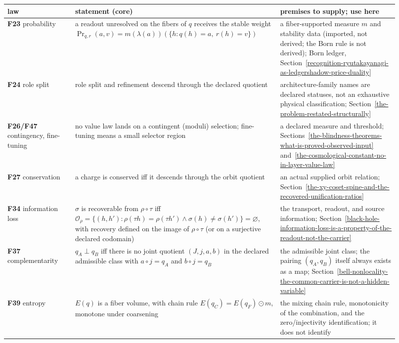 \documentclass[11pt]{article}
\theoremstyle{definition}
\begin{document}
\begin{center}
\small
\begin{longtable}[]{@{}p{0.16\linewidth}p{0.48\linewidth}p{0.28\linewidth}@{}}
\toprule
law & statement (core) & premises to supply; use here\\
\midrule
\endhead
\textbf{F23} probability & a readout unresolved on the fibers of \(q\) receives the stable weight
\(\Pr_{q,r}(a,v)=m(\lambda(a))(\{h: q(h)=a,\ r(h)=v\})\) & a fiber-supported measure \(m\) and stability data
(imported, not derived; the Born rule is not derived); Born ledger, Section~\ref{recognition-ryutakayanagi-as-ledgershadow-price-duality}\\
\textbf{F24} role split & role split and refinement descend through the declared quotient & architecture-family names
are declared statuses, not an exhaustive physical classification; Section~\ref{the-problem-restated-structurally}\\
\textbf{F26/F47} contingency, fine-tuning & no value law lands on a contingent (moduli) selection; fine-tuning means a
small selector region & a declared measure and threshold; Sections~\ref{the-blindness-theorems-what-is-proved-observed-input}
and~\ref{the-cosmological-constant-no-in-layer-value-law}\\
\textbf{F27} conservation & a charge is conserved iff it descends through the orbit quotient & an actual supplied orbit
relation; Section~\ref{the-xy-coset-spine-and-the-recovered-unification-ratios}\\
\textbf{F34} information loss & \(\sigma\) is recoverable from \(\rho\circ\tau\) iff
\(\mathcal O_\rho=\{(h,h'):\rho(\tau h)=\rho(\tau h') \wedge \sigma(h)\neq\sigma(h')\}=\varnothing\), with recovery
defined on the image of \(\rho\circ\tau\) (or on a surjective declared codomain) & the transport, readout, and source
information; Section~\ref{black-hole-information-loss-is-a-property-of-the-readout-not-the-carrier}\\
\textbf{F37} complementarity & \(q_A\perp q_B\) iff there is no joint quotient \((J,j,a,b)\) in the declared admissible
class with \(a\circ j=q_A\) and \(b\circ j=q_B\) & the admissible joint class; the pairing \((q_A,q_B)\) itself always
exists as a map; Section~\ref{bell-nonlocality-the-common-carrier-is-not-a-hidden-variable}\\
\textbf{F39} entropy & \(E(q)\) is a fiber volume, with chain rule \(E(q_C)=E(q_F)\odot m\), monotone under coarsening
& the mixing chain rule, monotonicity of the combination, and the zero/injectivity identification; it does not identify

\end{longtable}
\end{center}
\end{document}
